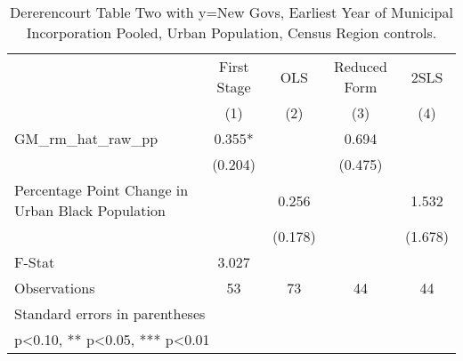 \begin{table}[htbp]\centering
\def\sym#1{\ifmmode^{#1}\else\(^{#1}\)\fi}
\caption{Dererencourt Table Two with y=New Govs, Earliest Year of Municipal Incorporation  Pooled, Urban Population, Census Region controls.}
\begin{tabular}{l*{4}{c}}
\toprule
                    & First Stage   &         OLS   &Reduced Form   &        2SLS   \\
                    &\multicolumn{1}{c}{(1)}   &\multicolumn{1}{c}{(2)}   &\multicolumn{1}{c}{(3)}   &\multicolumn{1}{c}{(4)}   \\
\midrule
GM\_rm\_hat\_raw\_pp    &       0.355*  &               &       0.694   &               \\
                    &     (0.204)   &               &     (0.475)   &               \\
\addlinespace
Percentage Point Change in Urban Black Population&               &       0.256   &               &       1.532   \\
                    &               &     (0.178)   &               &     (1.678)   \\
\midrule
F-Stat              &       3.027   &               &               &               \\
Observations        &          53   &          73   &          44   &          44   \\
\bottomrule
\multicolumn{5}{l}{\footnotesize Standard errors in parentheses}\\
\multicolumn{5}{l}{\footnotesize * p<0.10, ** p<0.05, *** p<0.01}\\
\end{tabular}
\end{table}
